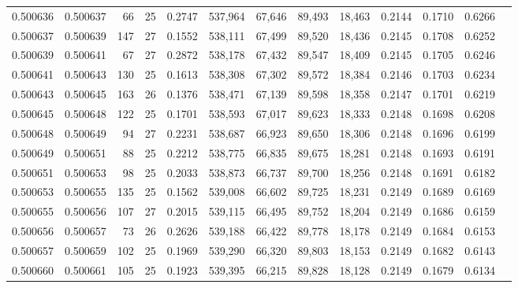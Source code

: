 \begin{tabular}{rrrrrrrrrrrrr}
0.500636 & 0.500637 &  66 &  25 &                                     0.2747 & 537,964 &  67,646 &  89,493 &  18,463 & 0.2144 & 0.1710 & 0.6266 \\
0.500637 & 0.500639 & 147 &  27 &                                     0.1552 & 538,111 &  67,499 &  89,520 &  18,436 & 0.2145 & 0.1708 & 0.6252 \\
0.500639 & 0.500641 &  67 &  27 &                                     0.2872 & 538,178 &  67,432 &  89,547 &  18,409 & 0.2145 & 0.1705 & 0.6246 \\
0.500641 & 0.500643 & 130 &  25 &                                     0.1613 & 538,308 &  67,302 &  89,572 &  18,384 & 0.2146 & 0.1703 & 0.6234 \\
0.500643 & 0.500645 & 163 &  26 &                                     0.1376 & 538,471 &  67,139 &  89,598 &  18,358 & 0.2147 & 0.1701 & 0.6219 \\
0.500645 & 0.500648 & 122 &  25 &                                     0.1701 & 538,593 &  67,017 &  89,623 &  18,333 & 0.2148 & 0.1698 & 0.6208 \\
0.500648 & 0.500649 &  94 &  27 &                                     0.2231 & 538,687 &  66,923 &  89,650 &  18,306 & 0.2148 & 0.1696 & 0.6199 \\
0.500649 & 0.500651 &  88 &  25 &                                     0.2212 & 538,775 &  66,835 &  89,675 &  18,281 & 0.2148 & 0.1693 & 0.6191 \\
0.500651 & 0.500653 &  98 &  25 &                                     0.2033 & 538,873 &  66,737 &  89,700 &  18,256 & 0.2148 & 0.1691 & 0.6182 \\
0.500653 & 0.500655 & 135 &  25 &                                     0.1562 & 539,008 &  66,602 &  89,725 &  18,231 & 0.2149 & 0.1689 & 0.6169 \\
0.500655 & 0.500656 & 107 &  27 &                                     0.2015 & 539,115 &  66,495 &  89,752 &  18,204 & 0.2149 & 0.1686 & 0.6159 \\
0.500656 & 0.500657 &  73 &  26 &                                     0.2626 & 539,188 &  66,422 &  89,778 &  18,178 & 0.2149 & 0.1684 & 0.6153 \\
0.500657 & 0.500659 & 102 &  25 &                                     0.1969 & 539,290 &  66,320 &  89,803 &  18,153 & 0.2149 & 0.1682 & 0.6143 \\
0.500660 & 0.500661 & 105 &  25 &                                     0.1923 & 539,395 &  66,215 &  89,828 &  18,128 & 0.2149 & 0.1679 & 0.6134 \\

\end{tabular}

